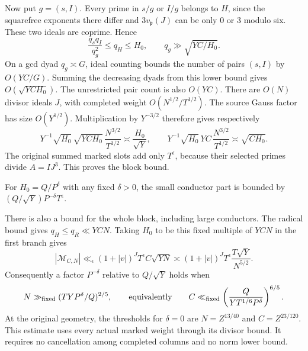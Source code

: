 \documentclass[11pt]{article}
\begin{document}
Now put $g=(s,I)$. Every prime in $s/g$ or $I/g$ belongs to $H$, since
the squarefree exponents there differ and $3v_{\mathfrak p}(J)$ can be
only $0$ or $3$ modulo six. These two ideals are coprime. Hence
\[
 \frac{q_s q_I}{q_g^2}\le q_H\le H_0,
 \qquad q_g\gg\sqrt{YC/H_0}.
\]
On a gcd dyad $q_g\asymp G$, ideal counting bounds the number of pairs
$(s,I)$ by $O(YC/G)$. Summing the decreasing dyads from this lower
bound gives $O(\sqrt{YC H_0})$. The unrestricted pair count is also
$O(YC)$.
There are $O(N)$ divisor ideals $J$, with completed weight
$O(N^{1/2}/T^{1/2})$. The source Gauss factor has size $O(Y^{1/2})$.
Multiplication by $Y^{-3/2}$ therefore gives respectively
\[
 Y^{-1}\sqrt{H_0}\,\sqrt{YC H_0}\,
       \frac{N^{3/2}}{T^{1/2}}
       \asymp\frac{H_0}{\sqrt Y},
 \qquad
 Y^{-1}\sqrt{H_0}\,YC\,
       \frac{N^{3/2}}{T^{1/2}}
       \asymp\sqrt{CH_0}.
\]
The original summed marked slots add only $T^\epsilon$, because their
selected primes divide $A=IJ^3$. This proves the block bound.

For $H_0=Q/P^\delta$ with any fixed $\delta>0$, the small conductor
part is bounded by $(Q/\sqrt Y)P^{-\delta}T^\epsilon$.

There is also a bound for the whole block, including large conductors.
The radical bound gives $q_H\le q_R\ll YCN$.
Taking $H_0$ to be this fixed multiple of $YCN$ in the first branch gives
\[
 |\mathcal M_{C,N}|\ll_\epsilon(1+|v|)^J T^\epsilon C\sqrt{YN}
       \asymp(1+|v|)^J T^\epsilon\frac{T\sqrt Y}{N^{5/2}}.
\]
Consequently a factor $P^{-\delta}$ relative to $Q/\sqrt Y$ holds when
\[
 N\gg_{\rm fixed}(TY P^\delta/Q)^{2/5},
 \qquad\text{equivalently}\qquad
 C\ll_{\rm fixed}\left(\frac{Q}{YT^{1/6}P^\delta}\right)^{6/5}.
\]
At the original geometry, the thresholds for $\delta=0$ are
$N=Z^{13/40}$ and $C=Z^{23/120}$.
This estimate uses every actual marked weight through its divisor bound.
It requires no cancellation among completed columns and no norm lower bound.
\end{document}
